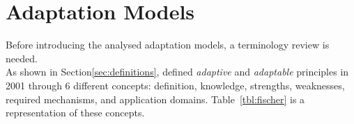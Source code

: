 \section{Adaptation Models}
\label{sec:adaptation_models}

Before introducing the analysed adaptation models, a terminology review is
needed. \\

As shown in Section\ref{sec:definitions}, \citet{fischer_user_2001} defined 
\textit{adaptive} and \textit{adaptable} principles in 2001 through 6 different 
concepts: definition, knowledge, strengths, weaknesses, required mechanisms, and 
application domains. Table~\ref{tbl:fischer} is a representation of these concepts.

